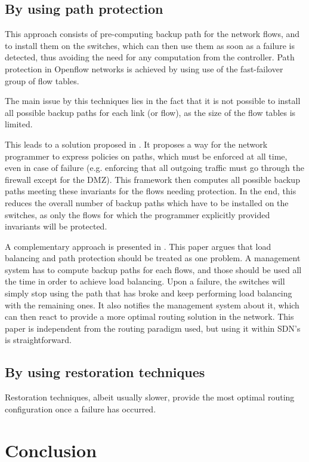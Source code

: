 \documentclass[compsoc]{IEEEtran}
\begin{document}
\subsection{By using path protection}
This approach consists of pre-computing backup path for the network flows, and to install them on the switches, which can then use them as soon as a failure is detected, thus avoiding the need for any computation from the controller. Path protection in Openflow networks is achieved by using use of the fast-failover group of flow tables.

The main issue by this techniques lies in the fact that it is not possible to install all possible backup paths for each link (or flow), as the size of the flow tables is limited.

This leads to a solution proposed in \cite{Reitblatt:2013:FDF:2491185.2491187}. It proposes a way for the network programmer to express policies on paths, which must be enforced at all time, even in case of failure (e.g. enforcing that all outgoing traffic must go through the firewall except for the DMZ). This framework then computes all possible backup paths meeting these invariants for the flows needing protection. In the end, this reduces the overall number of backup paths which have to be installed on the switches, as only the flows for which the programmer explicitly provided invariants will be protected.

A complementary approach is presented in \cite{Suchara:2011:NAJ:1993744.1993756}. This paper argues that load balancing and path protection should be treated as one problem. A management system has to compute backup paths for each flows, and those should be used all the time in order to achieve load balancing. Upon a failure, the switches will simply stop using the path that has broke and keep performing load balancing with the remaining ones. It also notifies the management system about it, which can then react to provide a more optimal routing solution in the network. This paper is independent from the routing paradigm used, but using it within SDN's is straightforward.

\subsection{By using restoration techniques}
Restoration techniques, albeit usually slower, provide the most optimal routing configuration once a failure has occurred.

\section{Conclusion}
\end{document}
